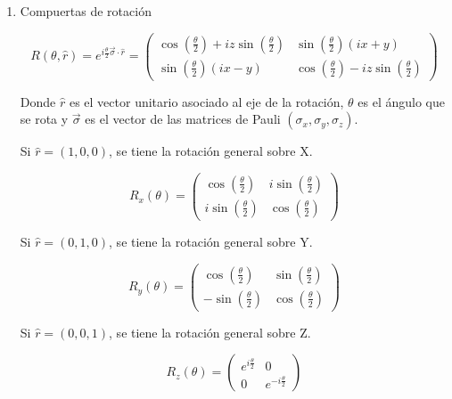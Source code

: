 \documentclass[xetex,mathserif,serif]{beamer}
\begin{document}
\begin{frame}
\begin{enumerate}
        \item Compuertas de rotación

            \[
            R(\theta,\hat{r}) = e^{i \frac{\theta}{2} \vec{\sigma} \cdot \hat{r}} =
            \begin{pmatrix}
            \cos(\frac{\theta}{2}) + i z \sin(\frac{\theta}{2}) & \sin(\frac{\theta}{2}) (i x + y) \\
            \sin(\frac{\theta}{2}) (i x - y) & \cos(\frac{\theta}{2}) - i z \sin(\frac{\theta}{2})
            \end{pmatrix}
            \]

            Donde $\hat{r}$ es el vector unitario asociado al eje de la rotación, $\theta$ es el ángulo que se rota y $\vec{\sigma}$ es el vector de las matrices de Pauli $(\sigma_x, \sigma_y, \sigma_z)$.

            Si $\hat{r} = (1,0,0)$, se tiene la rotación general sobre X.

            \[
            R_x(\theta) =
            \begin{pmatrix}
            \cos(\frac{\theta}{2}) & i \sin(\frac{\theta}{2}) \\
            i\sin(\frac{\theta}{2}) & \cos(\frac{\theta}{2})
            \end{pmatrix}
            \]

            Si $\hat{r} = (0,1,0)$, se tiene la rotación general sobre Y.

            \[
            R_y(\theta) =
            \begin{pmatrix}
            \cos(\frac{\theta}{2}) & \sin(\frac{\theta}{2}) \\
            -\sin(\frac{\theta}{2}) & \cos(\frac{\theta}{2})
            \end{pmatrix}
            \]

            Si $\hat{r} = (0,0,1)$, se tiene la rotación general sobre Z.

            \[
            R_z(\theta) =
            \begin{pmatrix}
            e^{i \frac{\theta}{2}} & 0 \\
            0 & e^{-i \frac{\theta}{2}}
            \end{pmatrix}
            \]

            \begin{figure}[H]
                \centering
                \begin{subfigure}[m]{0.32\textwidth}
                \centering
                    \begin{blochsphere}[radius=1.5cm,tilt=15,rotation=-20,opacity=0.05]


\end{blochsphere}
\end{subfigure}
\end{figure}
\end{enumerate}
\end{frame}
\end{document}
